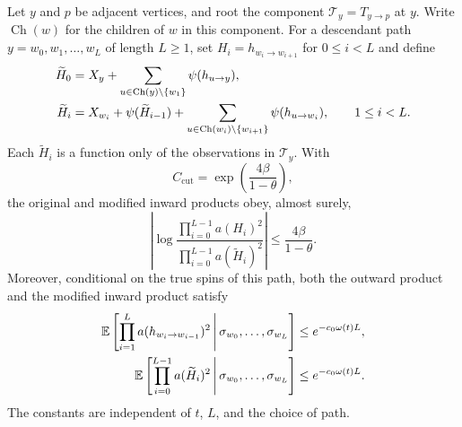 \begin{lemma}
\label{lem:cut-continuation}
Let $y$ and $p$ be adjacent vertices, and root the component
$\mathcal T_y=T_{y\to p}$ at $y$.  Write $\operatorname{Ch}(w)$ for the
children of $w$ in this component.  For a descendant path
$y=w_0,w_1,\ldots,w_L$ of length $L\ge1$, set
$H_i=h_{w_i\to w_{i+1}}$ for $0\le i<L$ and define
\begin{align}
 \widetilde H_0
  &=X_y+\sum_{u\in\operatorname{Ch}(y)\setminus\{w_1\}}
                   \psi(h_{u\to y}),\notag\\
 \widetilde H_i
  &=X_{w_i}+\psi(\widetilde H_{i-1})
       +\sum_{u\in\operatorname{Ch}(w_i)\setminus\{w_{i+1}\}}
                   \psi(h_{u\to w_i}),\qquad 1\le i<L.
 \label{eq:inward-cut-recursion}
\end{align}
Each $\widetilde H_i$ is a function only of the observations in
$\mathcal T_y$.  With
\[
 C_{\mathrm{cut}}=\exp\!\left(\frac{4\beta}{1-\theta}\right),
\]
the original and modified inward products obey, almost surely,
\begin{equation}
 \left|\log
   \frac{\prod_{i=0}^{L-1}a(H_i)^2}
        {\prod_{i=0}^{L-1}a(\widetilde H_i)^2}\right|
       \le\frac{4\beta}{1-\theta}.
 \label{eq:path-cut-cost}
\end{equation}
Moreover, conditional on the true spins of this path, both the outward
product and the modified inward product satisfy
\begin{equation}
 \begin{aligned}
 \mathbb E\left[\prod_{i=1}^{L}a(h_{w_i\to w_{i-1}})^2
       \,\middle|\,\sigma_{w_0},\ldots,\sigma_{w_L}\right]
       &\le e^{-c_0\omega(t)L},\\
 \mathbb E\left[\prod_{i=0}^{L-1}a(\widetilde H_i)^2
       \,\middle|\,\sigma_{w_0},\ldots,\sigma_{w_L}\right]
       &\le e^{-c_0\omega(t)L}.
 \end{aligned}
 \label{eq:cut-continuation-attenuation}
\end{equation}
The constants are independent of $t$, $L$, and the choice of path.
\end{lemma}

